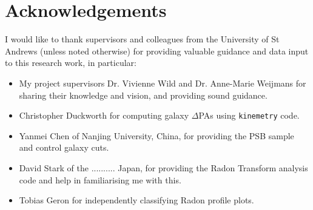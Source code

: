 \section*{Acknowledgements} %

I would like to thank supervisors and colleagues from the University of St Andrews (unless noted otherwise) for providing valuable guidance and data input to this research work, in particular:
\begin{itemize}
    \item My project supervisors Dr. Vivienne Wild and Dr. Anne-Marie Weijmans for sharing their knowledge and vision, and providing sound guidance. 
    \item Christopher Duckworth for computing galaxy $\Delta$PAs using \texttt{kinemetry} code.
    \item Yanmei Chen of Nanjing University, China, for providing the PSB sample and control galaxy cuts.
    \item David Stark of the .......... Japan, for providing the Radon Transform analysis code and help in familiarising me with this.
    \item Tobias Geron for independently classifying Radon profile plots.
\end{itemize}
